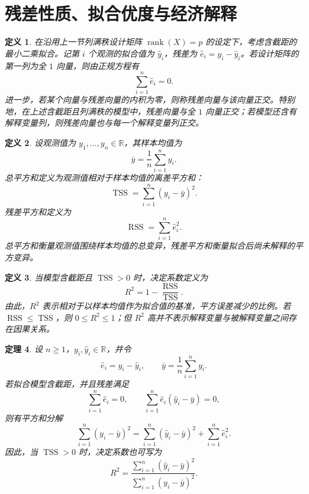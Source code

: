 \documentclass[UTF8,fontset=fandol,11pt]{ctexart}
\newtheorem{definition}{定义}[section]
\newtheorem{theorem}[definition]{定理}
\begin{document}
\section{残差性质、拟合优度与经济解释}\label{sec:S03}
\begin{definition}
在沿用上一节列满秩设计矩阵 $\operatorname{rank}(X)=p$ 的设定下，考虑含截距的最小二乘拟合。记第 $i$ 个观测的拟合值为 $\hat y_i$，残差为 $\hat e_i=y_i-\hat y_i$。若设计矩阵的第一列为全 $1$ 向量，则由正规方程有
\[
\sum_{i=1}^{n}\hat e_i=0.
\]
进一步，若某个向量与残差向量的内积为零，则称残差向量与该向量正交。特别地，在上述含截距且列满秩的模型中，残差向量与全 $1$ 向量正交；若模型还含有解释变量列，则残差向量也与每一个解释变量列正交。\label{def:orthogonal-residual}
\end{definition}
\begin{definition}
设观测值为 $y_1,\ldots,y_n\in\mathbb{R}$，其样本均值为
\[
\bar y=\frac{1}{n}\sum_{i=1}^{n}y_i.
\]
总平方和定义为观测值相对于样本均值的离差平方和：
\[
\operatorname{TSS}=\sum_{i=1}^{n}(y_i-\bar y)^2.
\]
残差平方和定义为
\[
\operatorname{RSS}=\sum_{i=1}^{n}\hat e_i^2.
\]
总平方和衡量观测值围绕样本均值的总变异，残差平方和衡量拟合后尚未解释的平方变异。\label{def:total-sum-of-squares}
\end{definition}
\begin{definition}
当模型含截距且 $\operatorname{TSS}>0$ 时，决定系数定义为
\[
R^2=1-\frac{\operatorname{RSS}}{\operatorname{TSS}}.
\]
由此，$R^2$ 表示相对于以样本均值作为拟合值的基准，平方误差减少的比例。若 $\operatorname{RSS}\leq\operatorname{TSS}$，则 $0\leq R^2\leq 1$；但 $R^2$ 高并不表示解释变量与被解释变量之间存在因果关系。\label{def:coefficient-of-determination}
\end{definition}
\begin{theorem}
设 $n\geq 1$，$y_i,\hat y_i\in\mathbb{R}$，并令
\[
\hat e_i=y_i-\hat y_i,
\qquad
\bar y=\frac{1}{n}\sum_{i=1}^{n}y_i.
\]
若拟合模型含截距，并且残差满足
\[
\sum_{i=1}^{n}\hat e_i=0,
\qquad
\sum_{i=1}^{n}\hat e_i(\hat y_i-\bar y)=0,
\]
则有平方和分解
\begin{equation}
\sum_{i=1}^{n}(y_i-\bar y)^2
=
\sum_{i=1}^{n}(\hat y_i-\bar y)^2
+
\sum_{i=1}^{n}\hat e_i^2.
\label{thm:sum-of-squares-decomposition}
\end{equation}
因此，当 $\operatorname{TSS}>0$ 时，决定系数也可写为
\[
R^2=
\frac{\sum_{i=1}^{n}(\hat y_i-\bar y)^2}
{\sum_{i=1}^{n}(y_i-\bar y)^2}.
\]
\end{theorem}
\end{document}
